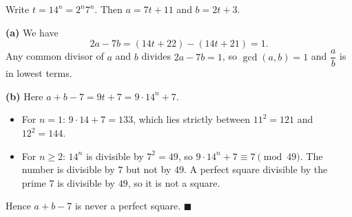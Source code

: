 Write $t=14^n=2^n7^n$. Then $a=7t+11$ and $b=2t+3$.

\textbf{(a)} We have
\[
2a-7b=(14t+22)-(14t+21)=1 .
\]
Any common divisor of $a$ and $b$ divides $2a-7b=1$, so $\gcd(a,b)=1$ and $\dfrac {a}{b}$ is in lowest terms.

\textbf{(b)} Here $a+b-7=9t+7=9\cdot14^n+7$.
\begin{itemize}
\item For $n=1$: $9\cdot14+7=133$, which lies strictly between $11^2=121$ and $12^2=144$.
\item For $n\ge2$: $14^n$ is divisible by $7^2=49$, so $9\cdot14^n+7\equiv7\pmod{49}$. The number is divisible by $7$ but not by $49$. A perfect square divisible by the prime $7$ is divisible by $49$, so it is not a square.
\end{itemize}
Hence $a+b-7$ is never a perfect square. $\blacksquare$
